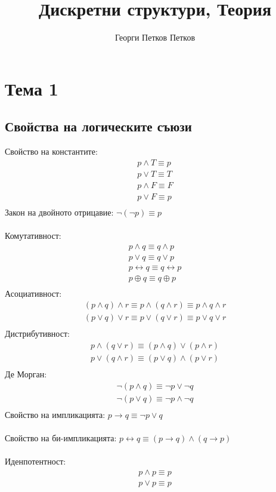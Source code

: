 \documentclass[12pt]{article}
\title{Дискретни структури, Теория}
\author{Георги Петков Петков}
\date{}
\begin{document}
    \maketitle
    \section*{Тема 1}
    \subsection*{Свойства на логическите съюзи}
    Свойство на константите:
    \begin{gather*}
        p \land T \equiv p \\
        p \lor T \equiv T \\
        p \land F \equiv F \\
        p \lor F \equiv p \\
    \end{gather*}
    Закон на двойното отрицавие: \( \neg(\neg p) \equiv p \) \\ \\
    Комутативност: 
    \begin{gather*}
        p \land q \equiv q \land p \\
        p \lor q \equiv q \lor p \\
        p \leftrightarrow q \equiv q \leftrightarrow p \\
        p \oplus q \equiv q \oplus p \\
    \end{gather*}
    Асоциативност:
    \begin{gather*}
        (p \land q) \land r \equiv p \land (q \land r) \equiv p \land q \land r \\
        (p \lor q) \lor r \equiv p \lor (q \lor r) \equiv p \lor q \lor r \\
    \end{gather*}
    Дистрибутивност:
    \begin{gather*}
        p \land (q \lor r) \equiv (p \land q) \lor (p \land r) \\
        p \lor (q \land r) \equiv (p \lor q) \land (p \lor r) \\ 
    \end{gather*}
    Де Морган:
    \begin{gather*}
        \neg (p \land q) \equiv \neg p \lor \neg q \\
        \neg (p \lor q) \equiv \neg p \land \neg q \\
    \end{gather*}
    Свойство на импликацията: \( p \to q \equiv \neg p \lor q \) \\ \\
    Свойство на би-импликацията: \( p \leftrightarrow q \equiv ( p \to q ) \land ( q \to p ) \) \\ \\
    Иденпотентност:
    \begin{gather*}
        p \land p \equiv p \\
        p \lor p \equiv p 
    \end{gather*}
\end{document}
